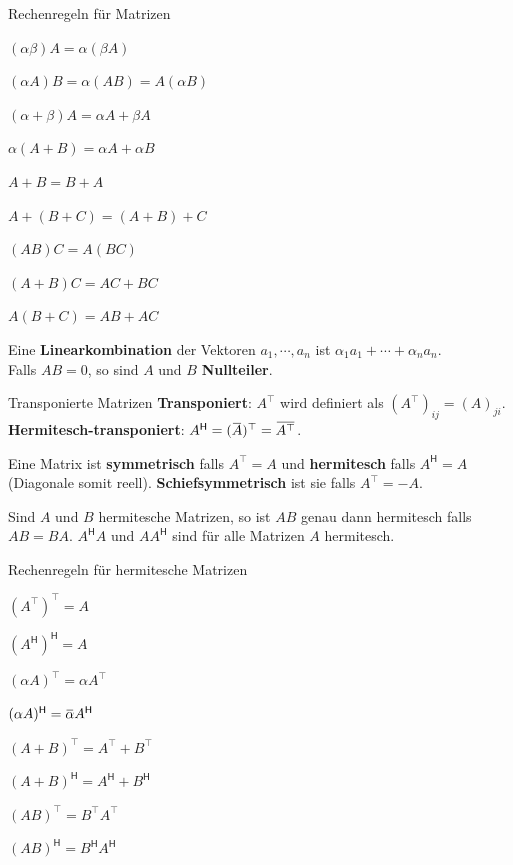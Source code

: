 \documentclass[a4paper,10pt]{article}
\newcommand*{\hermconj}{\mathsf{H}}
\newcommand{\overbar}[1]{\mkern 1.5mu\overline{\mkern-1.5mu#1\mkern-1.5mu}\mkern 1.5mu}
\begin{document}
\begin{subbox}{Rechenregeln für Matrizen}
  \begin{rowlist}
    \item $(\alpha \beta)A = \alpha(\beta A)$
    \item $(\alpha A)B = \alpha(AB) = A(\alpha B)$
    \item $(\alpha + \beta)A = \alpha A + \beta A$
    \item $\alpha(A + B) = \alpha A + \alpha B$
    \item $A + B = B + A$
    \item $A + (B + C) = (A + B) + C$
    \item $(AB)C = A(BC)$
    \item $(A + B)C = AC + BC$
    \item $A(B + C) = AB + AC$
  \end{rowlist}
\end{subbox}

Eine \textbf{Linearkombination} der Vektoren $a_1, \cdots, a_n$ ist $\alpha_1 a_1 + \cdots + \alpha_n a_n$.\\
Falls $AB = 0$, so sind $A$ und $B$ \textbf{Nullteiler}.\\
\begin{subbox}{Transponierte Matrizen}
  \textbf{Transponiert}: $A^\top$ wird definiert als $(A^\top)_{ij} = (A)_{ji}$.\\
  \textbf{Hermitesch-transponiert}: $A^\hermconj = (\overbar{A})^\top = \overbar{A^\top}$.
\end{subbox}
Eine Matrix ist \textbf{symmetrisch} falls $A^\top = A$ und \textbf{hermitesch} falls $A^\hermconj = A$ (Diagonale somit reell). \textbf{Schiefsymmetrisch} ist sie falls $A^\top = -A$. 

Sind $A$ und $B$ hermitesche Matrizen, so ist $AB$ genau dann hermitesch falls $AB = BA$. $A^\hermconj A$ und $A A^\hermconj$ sind für alle Matrizen $A$ hermitesch.

\begin{subbox}{Rechenregeln für hermitesche Matrizen}
  \begin{rowlist}
    \item $(A^\top)^\top = A$
    \item $(A^\hermconj)^\hermconj = A$
    \item $(\alpha A)^\top = \alpha A^\top$
    \item $(\alpha A)^\hermconj = \overbar{\alpha} A^\hermconj$
    \item $(A + B)^\top = A^\top + B^\top$
    \item $(A + B)^\hermconj = A^\hermconj + B^\hermconj$
    \item $(AB)^\top = B^\top A^\top$
    \item $(AB)^\hermconj = B^\hermconj A^\hermconj$
  \end{rowlist}
\end{subbox}
\end{document}

